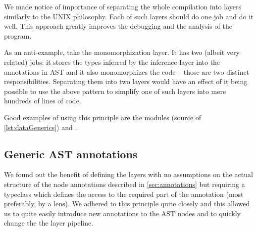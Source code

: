 We made notice of importance of separating the whole compilation into layers similarly to the UNIX philosophy. Each of such layers should do one job and do it well. This approach greatly improves the debugging and the analysis of the program.

As an anti-example, take the monomorphization layer. It has two (albeit very related) jobs: it stores the types inferred by the inference layer into the annotations in AST and it also monomorphizes the code -- those are two distinct responsibilities. Separating them into two layers would have an effect of it being possible to use the above pattern to simplify one of such layers into mere hundreds of lines of code.

Good examples of using this principle are the modules  (source of \cref{lst:dataGenerics}) and .

\subsection{Generic AST annotations}

We found out the benefit of defining the layers with no assumptions on the actual structure of the node annotations described in \cref{sec:annotations} but requiring a typeclass which defines the access to the required part of the annotation (most preferably, by a lens). We adhered to this principle quite closely and this allowed us to quite easily introduce new annotations to the AST nodes and to quickly change the the layer pipeline.
